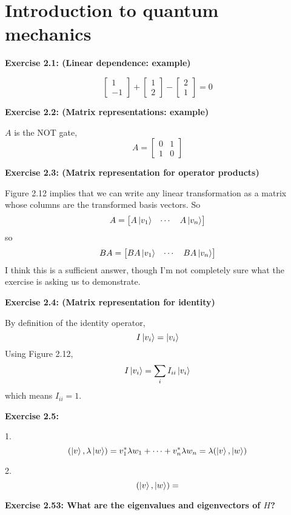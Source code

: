 \chapter{Introduction to quantum mechanics}

\textbf{Exercise 2.1: (Linear dependence: example)} 

$$\begin{bmatrix}
1 \\
-1
\end{bmatrix} + \begin{bmatrix}
1 \\
2
\end{bmatrix} - \begin{bmatrix}
2 \\ 
1
\end{bmatrix} = 0$$


\textbf{Exercise 2.2: (Matrix representations: example)} 

$A$ is the NOT gate, 
$$A = \begin{bmatrix}
0 & 1 \\
1 & 0
\end{bmatrix}$$


\textbf{Exercise 2.3: (Matrix representation for operator products)} 

Figure 2.12 implies that we can write any linear transformation as a matrix whose columns are the transformed basis vectors. So
$$A = \begin{bmatrix}
A \ket{v_{1}} & \cdots & A \ket{v_{n}}
\end{bmatrix}$$
 so 
$$BA = \begin{bmatrix}
BA \ket{v_{1}} & \cdots & BA \ket{v_{n}}
\end{bmatrix}$$
I think this is a sufficient answer, though I'm not completely sure what the exercise is asking us to demonstrate. 


\textbf{Exercise 2.4: (Matrix representation for identity)} 

By definition of the identity operator, $$I \ket{v_{i}} = \ket{v_{i}}$$
Using Figure 2.12, $$I \ket{v_{i}} = \sum_{i} I_{ii} \ket{v_{i}}$$ which means $I_{ii} = 1$. 

\textbf{Exercise 2.5: }

1. $$(\ket{v}, \lambda \ket{w}) = v_{1}^{*} \lambda w_{1} + \cdots + v_{n}^{*} \lambda w_{n} =  \lambda (\ket{v}, \ket{w})$$

2. $$(\ket{v}, \ket{w}) = $$

\textbf{Exercise 2.53: What are the eigenvalues and eigenvectors of $H$?}

